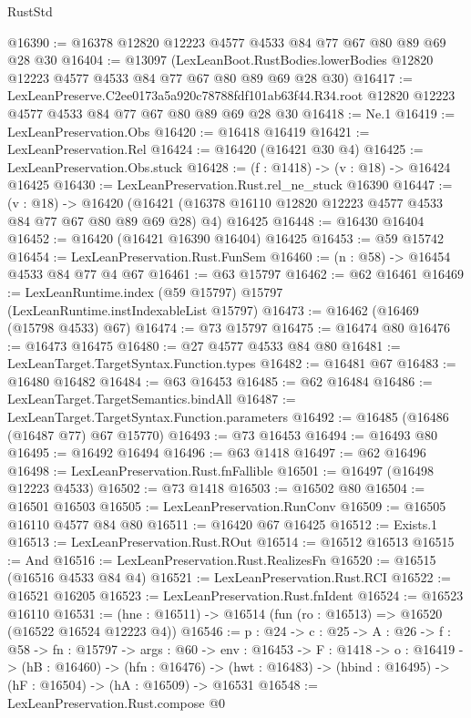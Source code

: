 \begin{lexlean}{RustStd}
\begin{coremodule}
@16390 := @16378 @12820 @12223 @4577 @4533 @84 @77 @67 @80 @89 @69 @28 @30
@16404 := @13097
    (LexLeanBoot.RustBodies.lowerBodies @12820 @12223 @4577 @4533 @84 @77 @67 @80 @89 @69 @28 @30)
@16417 := LexLeanPreserve.C2ee0173a5a920c78788fdf101ab63f44.R34.root
    @12820
    @12223
    @4577
    @4533
    @84
    @77
    @67
    @80
    @89
    @69
    @28
    @30
@16418 := Ne.{1}
@16419 := LexLeanPreservation.Obs
@16420 := @16418 @16419
@16421 := LexLeanPreservation.Rel
@16424 := @16420 (@16421 @30 @4)
@16425 := LexLeanPreservation.Obs.stuck
@16428 := (f : @1418) -> (v : @18) -> @16424 @16425
@16430 := LexLeanPreservation.Rust.rel_ne_stuck @16390
@16447 := (v : @18) ->
  @16420 (@16421 (@16378 @16110 @12820 @12223 @4577 @4533 @84 @77 @67 @80 @89 @69 @28) @4) @16425
@16448 := @16430 @16404
@16452 := @16420 (@16421 @16390 @16404) @16425
@16453 := @59 @15742
@16454 := LexLeanPreservation.Rust.FunSem
@16460 := (n : @58) -> @16454 @4533 @84 @77 @4 @67
@16461 := @63 @15797
@16462 := @62 @16461
@16469 := LexLeanRuntime.index (@59 @15797) @15797 (LexLeanRuntime.instIndexableList @15797)
@16473 := @16462 (@16469 (@15798 @4533) @67)
@16474 := @73 @15797
@16475 := @16474 @80
@16476 := @16473 @16475
@16480 := @27 @4577 @4533 @84 @80
@16481 := LexLeanTarget.TargetSyntax.Function.types
@16482 := @16481 @67
@16483 := @16480 @16482
@16484 := @63 @16453
@16485 := @62 @16484
@16486 := LexLeanTarget.TargetSemantics.bindAll
@16487 := LexLeanTarget.TargetSyntax.Function.parameters
@16492 := @16485 (@16486 (@16487 @77) @67 @15770)
@16493 := @73 @16453
@16494 := @16493 @80
@16495 := @16492 @16494
@16496 := @63 @1418
@16497 := @62 @16496
@16498 := LexLeanPreservation.Rust.fnFallible
@16501 := @16497 (@16498 @12223 @4533)
@16502 := @73 @1418
@16503 := @16502 @80
@16504 := @16501 @16503
@16505 := LexLeanPreservation.RunConv
@16509 := @16505 @16110 @4577 @84 @80
@16511 := @16420 @67 @16425
@16512 := Exists.{1}
@16513 := LexLeanPreservation.Rust.ROut
@16514 := @16512 @16513
@16515 := And
@16516 := LexLeanPreservation.Rust.RealizesFn
@16520 := @16515 (@16516 @4533 @84 @4)
@16521 := LexLeanPreservation.Rust.RCI
@16522 := @16521 @16205
@16523 := LexLeanPreservation.Rust.fnIdent
@16524 := @16523 @16110
@16531 := (hne : @16511) -> @16514 (fun (ro : @16513) => @16520 (@16522 @16524 @12223 @4))
@16546 := {p : @24} ->
  {c : @25} ->
  {A : @26} ->
  {f : @58} ->
  {fn : @15797} ->
  {args : @60} ->
  {env : @16453} ->
  {F : @1418} ->
  {o : @16419} ->
  (hB : @16460) ->
  (hfn : @16476) -> (hwt : @16483) -> (hbind : @16495) -> (hF : @16504) -> (hA : @16509) -> @16531
@16548 := LexLeanPreservation.Rust.compose @0

\end{coremodule}
\end{lexlean}
